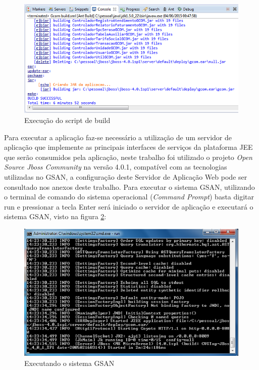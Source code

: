 \begin{figure}[H]
	\centering
	\caption{Execução do script de build}
	\label{figura:execucaoScriptBuild}
	\includegraphics{figuras/build_ant.png}
\end{figure}

Para executar a aplicação faz-se necessário a utilização de um servidor de aplicação que implemente as principais interfaces de serviços da plataforma JEE que serão consumidos pela aplicação, neste trabalho foi utilizado o projeto \textit{Open Source Jboss Community} na versão 4.0.1, compatível com as tecnologias utilizadas no GSAN, a configuração deste Servidor de Aplicação Web pode ser consultado nos anexos deste trabalho.
Para executar o sistema GSAN, utilizando o terminal de comando do sistema operacional (\textit{Command Prompt}) basta digitar run e pressionar a tecla Enter será iniciado o servidor de aplicação e executará o sistema GSAN, visto na figura \ref{figura:execucaoSistemaGSAN}:


\begin{figure}[!htb]
	\centering
	\caption{Executando o sistema GSAN}	
	\label{figura:execucaoSistemaGSAN}
	\includegraphics{figuras/executando_jboss.png}	
\end{figure}


